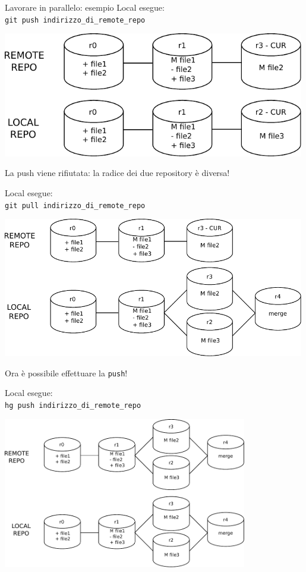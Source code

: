 \documentclass[presentation]{beamer}
\begin{document}
\begin{frame}{Lavorare in parallelo: esempio}
	Local esegue:\\
	\texttt{git push indirizzo\_di\_remote\_repo} \\
	\begin{center}
		\includegraphics[width=0.99\textwidth]{img/draw7}
	\end{center}
	La push viene rifiutata: la radice dei due repository è diversa!
	\framebreak{}
	
	Local esegue:\\
	\texttt{git pull indirizzo\_di\_remote\_repo} \\
	\begin{center}
		\includegraphics[width=0.99\textwidth]{img/draw9}
	\end{center}
	Ora è possibile effettuare la \texttt{push}!
	\framebreak{}
	
	Local esegue:\\
	\texttt{hg push indirizzo\_di\_remote\_repo} \\
	\begin{center}
		\includegraphics[width=0.8\textwidth]{img/draw10}
	\end{center}
\end{frame}
\end{document}
